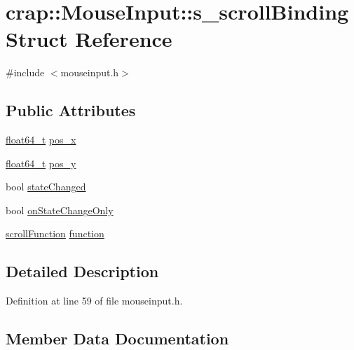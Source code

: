 \hypertarget{structcrap_1_1_mouse_input_1_1s__scroll_binding}{}\section{crap\+:\+:Mouse\+Input\+:\+:s\+\_\+scroll\+Binding Struct Reference}
\label{structcrap_1_1_mouse_input_1_1s__scroll_binding}


{\ttfamily \#include $<$mouseinput.\+h$>$}

\subsection*{Public Attributes}
\begin{DoxyCompactItemize}
\item 
\hyperlink{crap__types_8h_ac55f3ae81b5bc9053760baacf57e47f4}{float64\+\_\+t} \hyperlink{structcrap_1_1_mouse_input_1_1s__scroll_binding_a283ce47bf3af302550bd17b7e990f4ba}{pos\+\_\+x}
\item 
\hyperlink{crap__types_8h_ac55f3ae81b5bc9053760baacf57e47f4}{float64\+\_\+t} \hyperlink{structcrap_1_1_mouse_input_1_1s__scroll_binding_a2ae3a880b3e3eb89552c16f25a0a2a2c}{pos\+\_\+y}
\item 
bool \hyperlink{structcrap_1_1_mouse_input_1_1s__scroll_binding_acc7542a92b22f62a85d6800a08c9f2b5}{state\+Changed}
\item 
bool \hyperlink{structcrap_1_1_mouse_input_1_1s__scroll_binding_a74d94e372fc88fac3f133fa365b18237}{on\+State\+Change\+Only}
\item 
\hyperlink{classcrap_1_1_mouse_input_a76d83afa5ade8d873bc0866b37e36f37}{scroll\+Function} \hyperlink{structcrap_1_1_mouse_input_1_1s__scroll_binding_a0b077149c24a9048837b78aa7bf17353}{function}
\end{DoxyCompactItemize}


\subsection{Detailed Description}


Definition at line 59 of file mouseinput.\+h.



\subsection{Member Data Documentation}
\hypertarget{structcrap_1_1_mouse_input_1_1s__scroll_binding_a0b077149c24a9048837b78aa7bf17353}{}
